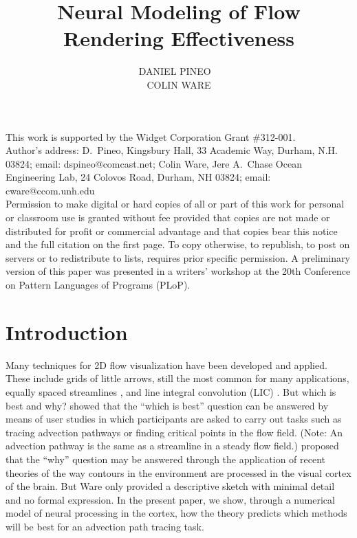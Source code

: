 \documentclass[prodmode,hillsideplop]{../acmlarge}
\title{Neural Modeling of Flow Rendering Effectiveness}
\author{DANIEL PINEO \affil{University of New Hampshire}\ \\
COLIN WARE \affil{University of New Hampshire}}
\begin{document}
\begin{bottomstuff}
This work is supported by the Widget Corporation Grant \#312-001.\\
Author's address: D.\ Pineo, Kingsbury Hall, 33 Academic Way, Durham,
N.H. 03824; email: dspineo@comcast.net; Colin Ware, Jere A.\ Chase
Ocean Engineering Lab, 24 Colovos Road, Durham, NH 03824; email: cware@ccom.unh.edu\\

Permission to make digital or hard copies of all or part of this work for personal or classroom use is granted without fee provided that copies are not made or distributed for profit or commercial advantage and that copies bear this notice and the full citation on the first page. To copy otherwise, to republish, to post on servers or to redistribute to lists, requires prior specific permission. A preliminary version of this paper was presented in a writers' workshop at the 20th Conference on Pattern Languages of Programs (PLoP).
\end{bottomstuff}


\maketitle

\section{Introduction}

Many techniques for 2D flow visualization have been developed and
applied. These include grids of little arrows, still the most common
for many applications, equally spaced streamlines
\cite{Turk1996,Jobard1997}, and line integral convolution (LIC)
\cite{Cabral1993}. But which is best and why? 
showed that the ``which is best'' question can be answered by means
of user studies in which participants are asked to carry out tasks
such as tracing advection pathways or finding critical points in the
flow field. (Note: An advection pathway is the same as a streamline
in a steady flow field.)  proposed that the ``why''
question may be answered through the application of recent theories
of the way contours in the environment are processed in the visual
cortex of the brain. But Ware only provided a descriptive sketch
with minimal detail and no formal expression. In the present paper,
we show, through a numerical model of neural processing in the
cortex, how the theory predicts which methods will be best for an
advection path tracing task.
\end{document}
